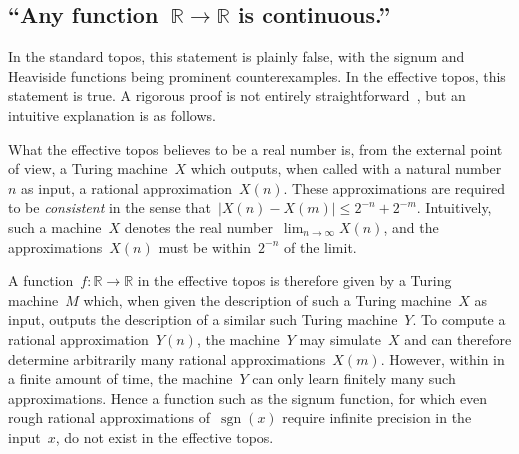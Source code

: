 \documentclass[oneside,reqno]{amsart}
\theoremstyle{definition}
\theoremstyle{plain}
\theoremstyle{remark}
\newcommand{\RR}{\mathbb{R}}
\renewcommand{\_}{\mathpunct{.}\,}
\newcommand{\effective}{ef{}fective\xspace}
\newcommand{\?}{\,{:}\,}
\begin{document}
\subsection{``Any function~$\RR \to \RR$ is continuous.''}\label{sect:eff-continuous}
In the standard topos, this statement is plainly false, with the signum and Heaviside functions
being prominent counterexamples. In the \effective topos, this statement is
true. A rigorous proof is not entirely straightforward~\cite{XXX}, but an intuitive
explanation is as follows.

What the \effective topos believes to be a real number is, from the external
point of view, a Turing machine~$X$ which outputs, when called with a natural
number~$n$ as input, a rational approximation~$X(n)$. These approximations are
required to be \emph{consistent} in the sense that~$|X(n) - X(m)|
\leq 2^{-n} + 2^{-m}$. Intuitively, such a machine~$X$ denotes the real
number~$\lim_{n \to \infty} X(n)$, and the approximations~$X(n)$ must be
within~$2^{-n}$ of the limit.

A function~$f : \RR \to \RR$ in the \effective topos is therefore given by a
Turing machine~$M$ which, when given the description of such a Turing machine~$X$ as
input, outputs the description of a similar such Turing machine~$Y$.
To compute a rational approximation~$Y(n)$, the machine~$Y$ may simulate~$X$
and can therefore determine arbitrarily many rational approximations~$X(m)$.
However, within in a finite amount of time, the machine~$Y$ can only learn finitely many
such approximations. Hence a function such as the signum function, for which
even rough rational approximations of~$\operatorname{sgn}(x)$ require infinite
precision in the input~$x$, do not exist in the \effective topos.
\end{document}
